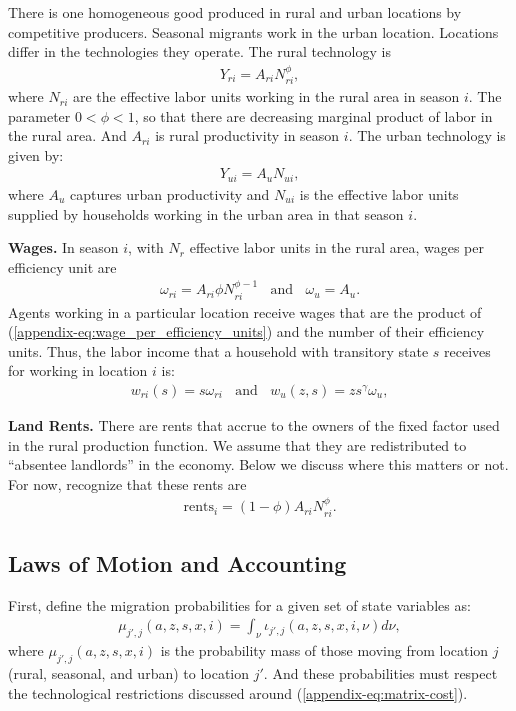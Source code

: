 \documentclass[12pt,pdftex]{article}
\begin{document}
There is one homogeneous good produced in rural and urban locations by competitive producers. Seasonal migrants work in the urban location. Locations differ in the technologies they operate. The rural technology is
\begin{align}
Y_{ri} = A_{ri} N_{ri}^\phi,
\end{align}
where $N_{ri}$ are the effective labor units working in the rural area in season $i$. The parameter $0<\phi <1$, so that there are decreasing marginal product of labor in the rural area. And $A_{ri}$ is rural productivity in season $i$. The urban technology is given by:
\begin{align}
Y_{ui} = A_u N_{ui},
\end{align}
where $A_u$ captures urban productivity and $N_{ui}$ is the effective labor units supplied by households working in the urban area in that season $i$.

\textbf{Wages.} In season $i$, with $N_r$ effective labor units in the rural area, wages per efficiency unit are
\begin{align}
\omega_{ri} = A_{ri} \phi N_{ri}^{\phi-1}  \ \ \ \  \mbox{and} \ \ \ \ \omega_u = A_u.
\label{appendix-eq:wage_per_efficiency_units}
\end{align}
Agents working in a particular location receive wages that are the product of (\ref{appendix-eq:wage_per_efficiency_units}) and the number of their efficiency units. Thus, the labor income that a household  with transitory state $s$ receives for working in location $i$ is:
\begin{align}
w_{ri}(s) = s \omega_{ri} \ \ \ \ \mbox{and} \ \ \ \ w_{u}(z,s) = z s^{\gamma} \omega_u,
\label{eq:wages}
\end{align}

\textbf{Land Rents.} There are rents that accrue to the owners of the fixed factor used in the rural production function. We assume that they are redistributed to ``absentee landlords'' in the economy. Below we discuss where this matters or not. For now, recognize that these rents are
\begin{align}
\mbox{rents}_{i} = (1-\phi) A_{ri} N_{ri}^{\phi}.
\label{eq:rents}
\end{align}


\subsection{Laws of Motion and Accounting}

First, define the migration probabilities for a given set of state variables as:
\begin{align}
\mu_{j',j}(a, z, s,  x, i) = \int_{\nu} \iota_{j',j}(a, z, s, x, i, \nu) d\nu,
\end{align}
where $\mu_{j',j}(a, z, s, x, i)$ is the probability mass of those moving from location $j$ (rural, seasonal, and urban) to location $j'$. And these probabilities must respect the technological restrictions discussed around (\ref{appendix-eq:matrix-cost}).
\end{document}
